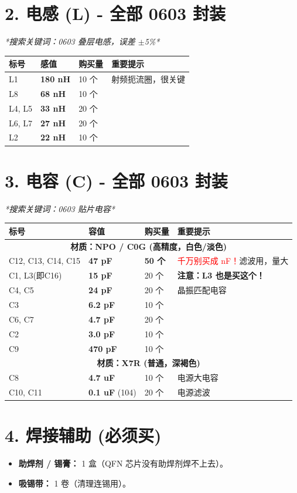 \documentclass[a4paper,12pt]{article}
\begin{document}
	\section{2. 电感 (L) - 全部 0603 封装}
	\textit{*搜索关键词：0603 叠层电感，误差 $\pm$5\%*}

	\begin{longtable}{|p{2cm}|p{2.5cm}|p{2cm}|p{7.5cm}|}
		\hline
		\textbf{标号} & \textbf{感值} & \textbf{购买量} & \textbf{重要提示} \\ \hline
		L1 & \textbf{180 nH} & 10 个 & 射频扼流圈，很关键 \\ \hline
		L8 & \textbf{68 nH} & 10 个 & \\ \hline
		L4, L5 & \textbf{33 nH} & 20 个 & \\ \hline
		L6, L7 & \textbf{27 nH} & 20 个 & \\ \hline
		L2 & \textbf{22 nH} & 10 个 & \\ \hline
	\end{longtable}

	\section{3. 电容 (C) - 全部 0603 封装}
	\textit{*搜索关键词：0603 贴片电容*}

	\begin{longtable}{|p{3.5cm}|p{2.5cm}|p{2cm}|p{6cm}|}
		\hline
		\textbf{标号} & \textbf{容值} & \textbf{购买量} & \textbf{重要提示} \\ \hline
		\multicolumn{4}{|c|}{\textbf{材质：NPO / C0G (高精度，白色/淡色)}} \\ \hline
		C12, C13, C14, C15 & \textbf{47 pF} & \textbf{50 个} & \textcolor{red}{千万别买成 nF！}滤波用，量大 \\ \hline
		C1, L3(即C16) & \textbf{15 pF} & 20 个 & \textbf{注意：L3 也是买这个！} \\ \hline
		C4, C5 & \textbf{24 pF} & 20 个 & 晶振匹配电容 \\ \hline
		C3 & \textbf{6.2 pF} & 10 个 & \\ \hline
		C6, C7 & \textbf{4.7 pF} & 20 个 & \\ \hline
		C2 & \textbf{3.0 pF} & 10 个 & \\ \hline
		C9 & \textbf{470 pF} & 10 个 & \\ \hline
		\multicolumn{4}{|c|}{\textbf{材质：X7R (普通，深褐色)}} \\ \hline
		C8 & \textbf{4.7 uF} & 10 个 & 电源大电容 \\ \hline
		C10, C11 & \textbf{0.1 uF} (104) & 20 个 & 电源滤波 \\ \hline
	\end{longtable}

	\section{4. 焊接辅助 (必须买)}
	\begin{itemize}
		\item \textbf{助焊剂 / 锡膏：} 1 盒（QFN 芯片没有助焊剂焊不上去）。
		\item \textbf{吸锡带：} 1 卷（清理连锡用）。
	\end{itemize}
\end{document}
